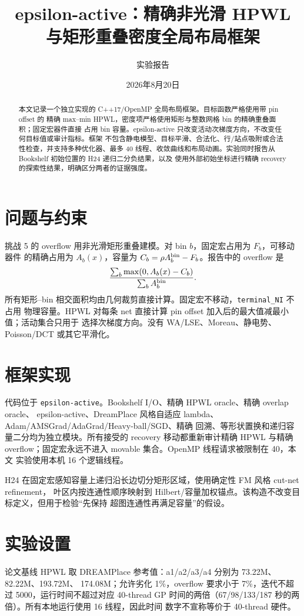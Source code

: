 \documentclass[UTF8,a4paper,11pt]{ctexart}
\title{epsilon-active：精确非光滑 HPWL 与矩形重叠密度全局布局框架}
\author{实验报告}
\date{2026年8月20日}
\begin{document}
\maketitle

\begin{abstract}
本文记录一个独立实现的 C++17/OpenMP 全局布局框架。目标函数严格使用带 pin offset 的
精确 max--min HPWL，密度项严格使用矩形与整数网格 bin 的精确重叠面积；固定宏器件直接
占用 bin 容量。epsilon-active 只改变活动次梯度方向，不改变任何目标值或审计指标。框架
不包含静电模型、目标平滑、合法化、行/站点吸附或合法性检查，并支持多种优化器、最多 40
线程、收敛曲线和布局动画。实验同时报告从 Bookshelf 初始位置的 H24 递归二分负结果，以及
使用外部初始坐标进行精确 recovery 的探索性结果，明确区分两者的证据强度。
\end{abstract}

\section{问题与约束}
挑战 5 的 overflow 用非光滑矩形重叠建模。对 bin $b$，固定宏占用为 $F_b$，可移动器件
的精确占用为 $A_b(x)$，容量为 $C_b=\rho A_b^{\rm bin}-F_b$。报告中的 overflow 是
\[
  \frac{\sum_b \max(0,A_b(x)-C_b)}{\sum_b A_b^{\rm bin}}.
\]
所有矩形--bin 相交面积均由几何裁剪直接计算。固定宏不移动，\texttt{terminal\_NI} 不占用
物理容量。HPWL 对每条 net 直接计算 pin offset 加入后的最大值减最小值；活动集合只用于
选择次梯度方向。没有 WA/LSE、Moreau、静电势、Poisson/DCT 或其它平滑化。

\section{框架实现}
代码位于 \texttt{epsilon-active}。Bookshelf I/O、精确 HPWL oracle、精确 overlap oracle、
epsilon-active、DreamPlace 风格自适应 lambda、Adam/AMSGrad/AdaGrad/Heavy-ball/SGD、精确
回溯、等形状置换和递归容量二分均为独立模块。所有接受的 recovery 移动都重新审计精确
HPWL 与精确 overflow；固定宏永远不进入 movable 集合。OpenMP 线程请求被限制在 40，本文
实验使用本机 16 个逻辑线程。

H24 在固定宏感知容量上递归沿长边切分矩形区域，使用确定性 FM 风格 cut-net refinement，
叶区内按连通性顺序映射到 Hilbert/容量加权锚点。该构造不改变目标定义，但用于检验“先保持
超图连通性再满足容量”的假设。

\section{实验设置}
论文基线 HPWL 取 DREAMPlace 参考值：a1/a2/a3/a4 分别为 73.22M、82.22M、193.72M、
174.08M；允许劣化 1\%，overflow 要求小于 7\%，迭代不超过 5000，运行时间不超过对应
40-thread GP 时间的两倍（67/98/133/187 秒的两倍）。所有本地运行使用 16 线程，因此时间
数字不宣称等价于 40-thread 硬件。
\end{document}
